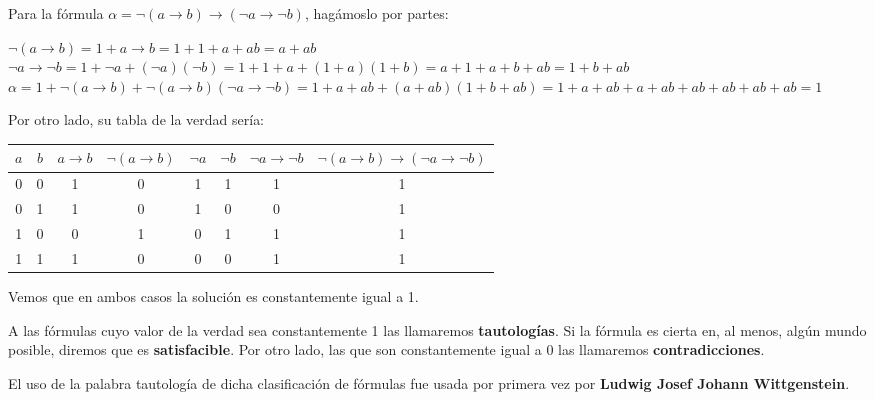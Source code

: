 \begin{ejemplo}
    Para la fórmula $\alpha = \neg (a \rightarrow b) \rightarrow (\neg a \rightarrow \neg b)$, hagámoslo por partes:
    \begin{center}
        $\neg (a \rightarrow b) = 1 + a \rightarrow b = 1 + 1 + a + ab = a + ab$ \\
        $\neg a \rightarrow \neg b = 1 + \neg a + (\neg a)(\neg b) = 1 + 1 + a + (1 + a)(1 + b) = a +1 +a +b +ab = 1 + b + ab$ \\
        $\alpha = 1 + \neg (a \rightarrow b) + \neg (a \rightarrow b) (\neg a \rightarrow \neg b) = 1 +a+ab+ (a+ab)(1 +b+ab) = 1 +a+ab+a+ab+ab+ab+ab+ab = 1$
    \end{center}

    Por otro lado, su tabla de la verdad sería:
    \begin{center}
        \begin{tabular}{|c|c||c|c|c|c|c|c|}
            \hline
            $a$ & $b$ & $a \rightarrow b$ & $\neg(a \rightarrow b)$ & $\neg a$ & $\neg b$ & $\neg a \rightarrow \neg b$ & $\neg (a \rightarrow b) \rightarrow (\neg a \rightarrow \neg b)$ \\
            \hline
            0   & 0   & 1                 & 0                       & 1        & 1        & 1                           & 1                                                                \\
            0   & 1   & 1                 & 0                       & 1        & 0        & 0                           & 1                                                                \\
            1   & 0   & 0                 & 1                       & 0        & 1        & 1                           & 1                                                                \\
            1   & 1   & 1                 & 0                       & 0        & 0        & 1                           & 1                                                                \\
            \hline
        \end{tabular}
    \end{center}
    Vemos que en ambos casos la solución es constantemente igual a 1.
\end{ejemplo}

A las fórmulas cuyo valor de la verdad sea constantemente 1 las llamaremos \textbf{tautologías}. Si la fórmula es cierta en, al menos, algún mundo posible, diremos que es \textbf{satisfacible}.
Por otro lado, las que son constantemente igual a 0 las llamaremos \textbf{contradicciones}.
\begin{nota}
    El uso de la palabra tautología de dicha clasificación de fórmulas fue usada por primera vez por \textbf{Ludwig Josef Johann Wittgenstein}.
\end{nota}

